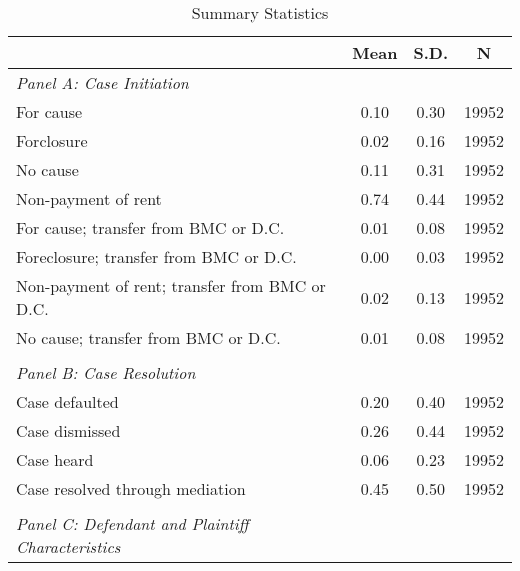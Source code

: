 \begin{table}[htbp]\centering
\def\sym#1{\ifmmode^{#1}\else\(^{#1}\)\fi}
\caption{Summary Statistics}
\begin{tabular}{l*{1}{ccc}}
\toprule
                    &        Mean&        S.D.&           N\\
\midrule
\emph{Panel A: Case Initiation}&            &            &            \\
\hspace{0.25cm}For cause&        0.10&        0.30&       19952\\
\hspace{0.25cm}Forclosure&        0.02&        0.16&       19952\\
\hspace{0.25cm}No cause&        0.11&        0.31&       19952\\
\hspace{0.25cm}Non-payment of rent&        0.74&        0.44&       19952\\
\hspace{0.25cm}For cause; transfer from BMC or D.C.&        0.01&        0.08&       19952\\
\hspace{0.25cm}Foreclosure; transfer from BMC or D.C.&        0.00&        0.03&       19952\\
\hspace{0.25cm}Non-payment of rent; transfer from BMC or D.C.&        0.02&        0.13&       19952\\
\hspace{0.25cm}No cause; transfer from BMC or D.C.&        0.01&        0.08&       19952\\
\vspace{0.1em} \\ \emph{Panel B: Case Resolution}&            &            &            \\
\hspace{0.25cm}Case defaulted&        0.20&        0.40&       19952\\
\hspace{0.25cm}Case dismissed&        0.26&        0.44&       19952\\
\hspace{0.25cm}Case heard&        0.06&        0.23&       19952\\
\hspace{0.25cm}Case resolved through mediation&        0.45&        0.50&       19952\\
\vspace{0.1em} \\ \emph{Panel C: Defendant and Plaintiff Characteristics}&            &            &            \\

\end{tabular}
\end{table}
